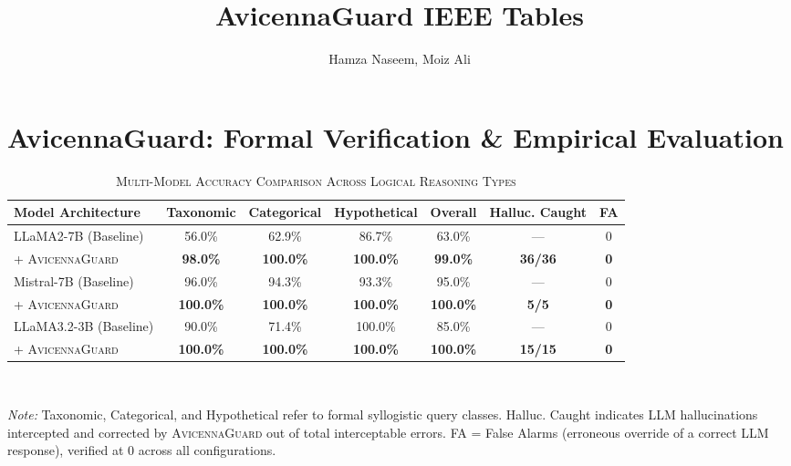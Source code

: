 \documentclass[journal]{IEEEtran}
\title{AvicennaGuard IEEE Tables}
\author{Hamza Naseem, Moiz Ali}
\begin{document}
\maketitle

\section*{AvicennaGuard: Formal Verification & Empirical Evaluation}

\begin{table}[t]
\centering
\caption{\textsc{Multi-Model Accuracy Comparison Across Logical Reasoning Types}}
\label{tab:main_results}
\begin{tabular}{lcccccc}
  \toprule
  \textbf{Model Architecture} & \textbf{Taxonomic} & \textbf{Categorical} & \textbf{Hypothetical} & \textbf{Overall} & \textbf{Halluc. Caught} & \textbf{FA} \\
  \midrule
  LLaMA2-7B (Baseline) & 56.0\% & 62.9\% & 86.7\% & 63.0\% & --- & 0 \\
  \quad + \textsc{AvicennaGuard} & \textbf{98.0\%} & \textbf{100.0\%} & \textbf{100.0\%} & \textbf{99.0\%} & \textbf{36/36} & \textbf{0} \\
  \midrule
  Mistral-7B (Baseline) & 96.0\% & 94.3\% & 93.3\% & 95.0\% & --- & 0 \\
  \quad + \textsc{AvicennaGuard} & \textbf{100.0\%} & \textbf{100.0\%} & \textbf{100.0\%} & \textbf{100.0\%} & \textbf{5/5} & \textbf{0} \\
  \midrule
  LLaMA3.2-3B (Baseline) & 90.0\% & 71.4\% & 100.0\% & 85.0\% & --- & 0 \\
  \quad + \textsc{AvicennaGuard} & \textbf{100.0\%} & \textbf{100.0\%} & \textbf{100.0\%} & \textbf{100.0\%} & \textbf{15/15} & \textbf{0} \\
  \bottomrule
\end{tabular}
\vspace{1mm}
\\[-1mm]
\raggedright
\footnotesize{\textit{Note:} Taxonomic, Categorical, and Hypothetical refer to formal syllogistic query classes. Halluc. Caught indicates LLM hallucinations intercepted and corrected by \textsc{AvicennaGuard} out of total interceptable errors. FA = False Alarms (erroneous override of a correct LLM response), verified at 0 across all configurations.}
\end{table}

\vspace{0.5cm}
\end{document}
